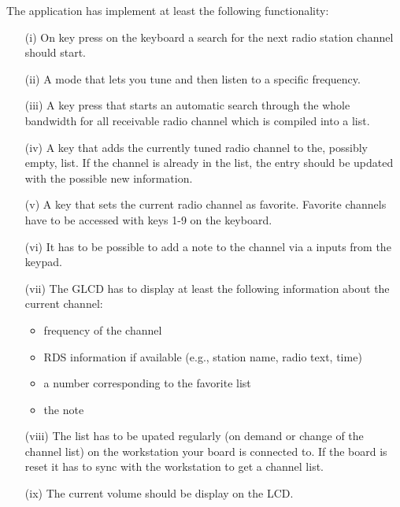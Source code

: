 \documentclass[a4paper,10pt]{article}
\begin{document}
The application has implement at least the following functionality:
\begin{itemize}
	\item[(i)] On key press on the keyboard a search for the next radio station channel should start.
	\item[(ii)] A mode that lets you tune and then listen to a specific frequency.
	\item[(iii)] A key press that starts an automatic search through the whole bandwidth for all receivable radio channel
which is compiled into a list. 
	\item[(iv)] A key that adds the currently tuned radio channel to the, possibly empty, list.
If the channel is already in the list, the entry should be updated with the possible new information.
	\item[(v)] A key that sets the current radio channel as favorite. Favorite
channels have to be accessed with keys 1-9 on the keyboard.
	\item[(vi)] It has to be possible to add a note to the channel via a inputs from the keypad.
	\item[(vii)] The GLCD has to display at least the following information about the current channel:
\begin{itemize}
\item frequency of the channel
\item RDS information if available (e.g., station name, radio text, time)
\item a number corresponding to the favorite list
\item the note
\end{itemize}
	\item[(viii)] The list has to be upated regularly (on demand or change of the channel list) on the workstation your board is connected to.
If the board is reset it has to sync with the workstation to
get a channel list.
	\item[(ix)] The current volume should be display on the LCD.
\end{itemize}

\end{document}

